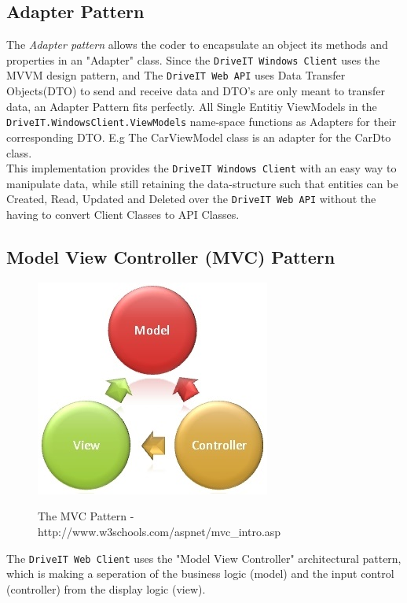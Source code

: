 \subsection{Adapter Pattern}
The \textit{Adapter pattern} allows the coder to encapsulate an object its methods and properties in an "Adapter" class. Since the \texttt{DriveIT Windows Client} uses the MVVM design pattern, and The \texttt{DriveIT Web API} uses Data Transfer Objects(DTO) to send and receive data and DTO's are only meant to transfer data, an Adapter Pattern fits perfectly. All Single Entitiy ViewModels in the \texttt{DriveIT.WindowsClient.ViewModels} name-space functions as Adapters for their corresponding DTO. E.g The CarViewModel class is an adapter for the CarDto class.\\ 

This implementation provides the \texttt{DriveIT Windows Client} with an easy way to manipulate data, while still retaining the data-structure such that entities can be Created, Read, Updated and Deleted over the \texttt{DriveIT Web API} without the having to convert Client Classes to API Classes.

\subsection{Model View Controller (MVC) Pattern}
\begin{figure}[H]
	\centering
	\includegraphics[scale=0.6]{Figures/WebImages/MVCPattern}\\
	\caption{The MVC Pattern - http://www.w3schools.com/aspnet/mvc_intro.asp}
	\label{fig:MVCPattern}
\end{figure}
The \texttt{DriveIT Web Client} uses the "Model View Controller" architectural pattern, which is making a seperation of the business logic (model) and the input control (controller) from the display logic (view).


